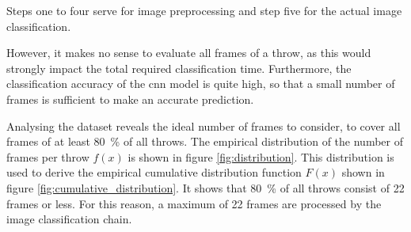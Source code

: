 Steps one to four serve for image preprocessing and step five for the actual image classification.

However, it makes no sense to evaluate all frames of a throw, as this would strongly impact the total required classification time.
Furthermore, the classification accuracy of the \acrshort{cnn} model is quite high, so that a small number of frames is sufficient to make an accurate prediction.

Analysing the dataset reveals the ideal number of frames to consider, to cover all frames of at least \SI{80}{\percent} of all throws.
The empirical distribution of the number of frames per throw $f(x)$ is shown in figure \ref{fig:distribution}.
This distribution is used to derive the empirical cumulative distribution function $F(x)$ shown in figure \ref{fig:cumulative_distribution}.
It shows that \SI{80}{\percent} of all throws consist of \num{22} frames or less.
For this reason, a maximum of \num{22} frames are processed by the image classification chain.

